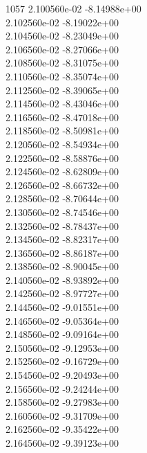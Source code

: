 1057	2.100560e-02	-8.14988e+00	\\ 	2.102560e-02	-8.19022e+00	\\ 	2.104560e-02	-8.23049e+00	\\ 	2.106560e-02	-8.27066e+00	\\ 	2.108560e-02	-8.31075e+00	\\ 	2.110560e-02	-8.35074e+00	\\ 	2.112560e-02	-8.39065e+00	\\ 	2.114560e-02	-8.43046e+00	\\ 	2.116560e-02	-8.47018e+00	\\ 	2.118560e-02	-8.50981e+00	\\ 	2.120560e-02	-8.54934e+00	\\ 	2.122560e-02	-8.58876e+00	\\ 	2.124560e-02	-8.62809e+00	\\ 	2.126560e-02	-8.66732e+00	\\ 	2.128560e-02	-8.70644e+00	\\ 	2.130560e-02	-8.74546e+00	\\ 	2.132560e-02	-8.78437e+00	\\ 	2.134560e-02	-8.82317e+00	\\ 	2.136560e-02	-8.86187e+00	\\ 	2.138560e-02	-8.90045e+00	\\ 	2.140560e-02	-8.93892e+00	\\ 	2.142560e-02	-8.97727e+00	\\ 	2.144560e-02	-9.01551e+00	\\ 	2.146560e-02	-9.05364e+00	\\ 	2.148560e-02	-9.09164e+00	\\ 	2.150560e-02	-9.12953e+00	\\ 	2.152560e-02	-9.16729e+00	\\ 	2.154560e-02	-9.20493e+00	\\ 	2.156560e-02	-9.24244e+00	\\ 	2.158560e-02	-9.27983e+00	\\ 	2.160560e-02	-9.31709e+00	\\ 	2.162560e-02	-9.35422e+00	\\ 	2.164560e-02	-9.39123e+00	\\ \hline
